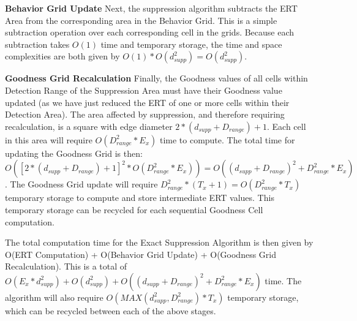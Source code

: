 \textbf{Behavior Grid Update}\newline
Next, the suppression algorithm subtracts the ERT Area from the corresponding area in the Behavior Grid.  This is a simple subtraction operation over each corresponding cell in the grids.  Because each subtraction takes $O(1)$ time and temporary storage, the time and space complexities are both given by $O(1) * O(d_{supp}^2) = O(d_{supp}^2)$.

\textbf{Goodness Grid Recalculation}\newline
Finally, the Goodness values of all cells within Detection Range of the Suppression Area must have their Goodness value updated (as we have just reduced the ERT of one or more cells within their Detection Area).  The area affected by suppression, and therefore requiring recalculation, is a square with edge diameter $2 * (d_{supp} + D_{range}) + 1$.  Each cell in this area will require  $O(D_{range}^2 * E_x)$ time to compute.  The total time for updating the Goodness Grid is then: $O([2 * (d_{supp} + D_{range}) + 1]^2 * O(D_{range}^2 * E_x)) = O((d_{supp} + D_{range})^2 + D_{range}^2 * E_x)$.  The Goodness Grid update will require $D_{range}^2 * (T_x + 1) = O(D_{range}^2 * T_x)$ temporary storage to compute and store intermediate ERT values.  This temporary storage can be recycled for each sequential Goodness Cell computation.


The total computation time for the Exact Suppression Algorithm is then given by O(ERT Computation) + O(Behavior Grid Update) + O(Goodness Grid Recalculation). This is a total of $O(E_{x} * d_{supp}^2) + O(d_{supp}^2) + O((d_{supp} + D_{range})^2 + D_{range}^2 * E_x)$ time.  The algorithm will also require $O(MAX(d_{supp}^2 , D_{range}^2) * T_x)$ temporary storage, which can be recycled between each of the above stages.
